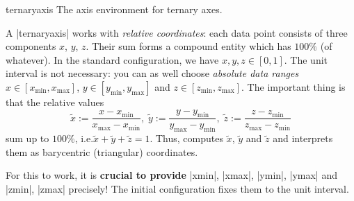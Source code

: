 \begin{environment}{{ternaryaxis}}
    The axis environment for ternary axes.
\begin{codeexample}[]
\end{codeexample}

    A |ternaryaxis| works with \emph{relative coordinates}: each data point
    consists of three components $x$, $y$, $z$. Their sum forms a compound
    entity which has $100\%$ (of whatever). In the standard configuration, we
    have $x,y,z \in [0,1]$. The unit interval is not necessary: you can as well
    choose \emph{absolute data ranges} $x \in [x_{\min},x_{\max}]$, $y \in
    [y_{\min},y_{\max}]$ and $z \in [z_{\min},z_{\max}]$. The important thing
    is that the relative values
        \[
            \tilde x := \frac{x-x_{\min}}{x_{\max} - x_{\min}},\;
            \tilde y := \frac{y-y_{\min}}{y_{\max} - y_{\min}},\;
            \tilde z := \frac{z-z_{\min}}{z_{\max} - z_{\min}}
        \]
    sum up to $100\%$, i.e.\@ $\tilde x + \tilde y + \tilde z = 1$. Thus,
    \PGFPlots{} computes $\tilde x$, $\tilde y$ and $\tilde z$ and interprets
    them as barycentric (triangular) coordinates.

    For this to work, it is \textbf{crucial to provide } |xmin|, |xmax|,
    |ymin|, |ymax| and |zmin|, |zmax| precisely! The initial configuration
    fixes them to the unit interval.


\end{environment}
